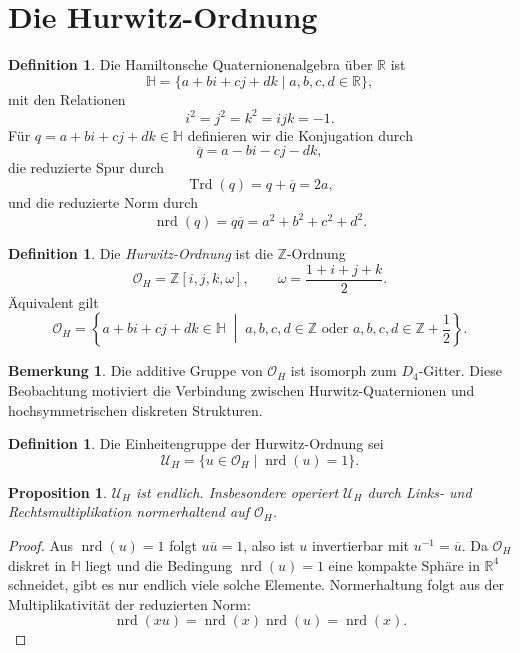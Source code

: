 \documentclass[12pt,a4paper]{article}
\newcommand{\HH}{\mathbb{H}}
\newcommand{\ZZ}{\mathbb{Z}}
\newcommand{\RR}{\mathbb{R}}
\newcommand{\OO}{\mathcal{O}}
\newcommand{\UU}{\mathcal{U}}
\newcommand{\nrd}{\operatorname{nrd}}
\newcommand{\Trd}{\operatorname{Trd}}
\newtheorem{proposition}[theorem]{Proposition}
\theoremstyle{definition}
\newtheorem{definition}[theorem]{Definition}
\newtheorem{remark}[theorem]{Bemerkung}
\begin{document}
	\section{Die Hurwitz-Ordnung}
	
	\begin{definition}
		Die Hamiltonsche Quaternionenalgebra über \(\RR\) ist
		\[
		\HH=\{a+bi+cj+dk \mid a,b,c,d\in\RR\},
		\]
		mit den Relationen
		\[
		i^2=j^2=k^2=ijk=-1.
		\]
		Für \(q=a+bi+cj+dk\in\HH\) definieren wir die Konjugation durch
		\[
		\overline q=a-bi-cj-dk,
		\]
		die reduzierte Spur durch
		\[
		\Trd(q)=q+\overline q=2a,
		\]
		und die reduzierte Norm durch
		\[
		\nrd(q)=q\overline q=a^2+b^2+c^2+d^2.
		\]
	\end{definition}
	
	\begin{definition}
		Die \emph{Hurwitz-Ordnung} ist die \(\ZZ\)-Ordnung
		\[
		\OO_H=\ZZ[i,j,k,\omega],\qquad \omega=\frac{1+i+j+k}{2}.
		\]
		Äquivalent gilt
		\[
		\OO_H=
		\left\{
		a+bi+cj+dk \in \HH \;\middle|\;
		a,b,c,d\in\ZZ \text{ oder } a,b,c,d\in \ZZ+\frac12
		\right\}.
		\]
	\end{definition}
	
	\begin{remark}
		Die additive Gruppe von \(\OO_H\) ist isomorph zum \(D_4\)-Gitter. Diese Beobachtung motiviert die Verbindung zwischen Hurwitz-Quaternionen und hochsymmetrischen diskreten Strukturen.
	\end{remark}
	
	\begin{definition}
		Die Einheitengruppe der Hurwitz-Ordnung sei
		\[
		\UU_H=\{u\in\OO_H \mid \nrd(u)=1\}.
		\]
	\end{definition}
	
	\begin{proposition}
		\(\UU_H\) ist endlich. Insbesondere operiert \(\UU_H\) durch Links- und Rechtsmultiplikation normerhaltend auf \(\OO_H\).
	\end{proposition}
	
	\begin{proof}
		Aus \(\nrd(u)=1\) folgt \(u\overline u=1\), also ist \(u\) invertierbar mit \(u^{-1}=\overline u\). Da \(\OO_H\) diskret in \(\HH\) liegt und die Bedingung \(\nrd(u)=1\) eine kompakte Sphäre in \(\RR^4\) schneidet, gibt es nur endlich viele solche Elemente. Normerhaltung folgt aus der Multiplikativität der reduzierten Norm:
		\[
		\nrd(xu)=\nrd(x)\nrd(u)=\nrd(x).
		\]
	\end{proof}
	
\end{document}
